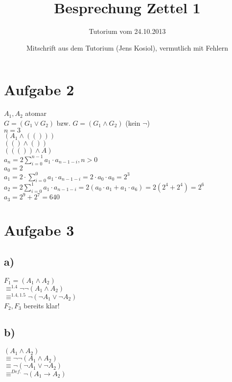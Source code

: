 \documentclass[a4paper]{scrartcl}
\begin{document}
\title{Besprechung Zettel 1}
\subtitle{Tutorium vom 24.10.2013}
\author{Mitschrift aus dem Tutorium (Jens Kosiol), vermutlich mit Fehlern}
\maketitle

\section*{Aufgabe 2}

$A_1, A_2$ atomar\\
$G = (G_1 \vee G_2 )$ bzw. $G = (G_1 \wedge G_2)$ (kein $\neg$)\\
$n = 3$\\
$(A_1 \wedge (( )))$\\
$(( ) \wedge ( ))$\\
$((( )) \wedge A ) $\\
$a_n = 2 \sum_{i=0}^{n-1} a_1 \cdot a_{n-1-i} , n>0$\\
$a_0 = 2$\\
$a_1 = 2 \cdot \sum_{i=0}^0 a_1 \cdot a_{n-1-i} = 2 \cdot a_0 \cdot a_0 = 2^3$\\
$a_2 = 2 \sum_{i=0}^1 a_1 \cdot a_{n-1-i} = 2(a_0 \cdot a_1 + a_1 \cdot a_6) = 2(2^4 + 2^4) = 2^6$\\
$a_3 = 2^9 + 2^7 = 640$

\section*{Aufgabe 3}

\subsection*{a)}
$F_1 = (A_1 \wedge A_2)$\\
$\equiv^{1.4} \neg \neg (A_1 \wedge A_2)$\\
$\equiv^{1.4, 1.5} \neg ( \neg A_1 \vee \neg A_2)$\\
$F_2, F_3$ bereits klar!

\subsection*{b)}

$(A_1 \wedge A_2)$\\
$\equiv \neg \neg (A_1 \wedge A_2)$\\
$\equiv \neg ( \neg A_1 \vee \neg A_2)$\\
$\equiv^{Def.} \neg (A_1 \rightarrow A_2)$
\end{document}
